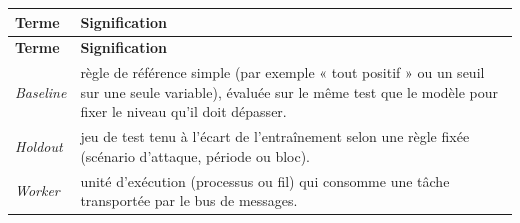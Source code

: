 \begin{longtable}{p{3.2cm}p{11.2cm}}
\textbf{Terme} & \textbf{Signification} \\
\toprule
\endfirsthead
\textbf{Terme} & \textbf{Signification} \\
\toprule
\endhead

\textit{Baseline} &
règle de référence simple (par exemple « tout positif » ou un seuil sur une seule variable), évaluée sur le même test que le modèle pour fixer le niveau qu'il doit dépasser. \\

\textit{Holdout} &
jeu de test tenu à l'écart de l'entraînement selon une règle fixée (scénario d'attaque, période ou bloc). \\

\textit{Worker} &
unité d'exécution (processus ou fil) qui consomme une tâche transportée par le bus de messages. \\

\bottomrule
\end{longtable}
